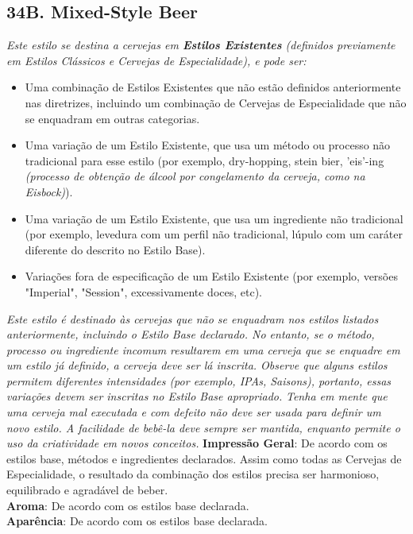 \subsection*{34B. Mixed-Style Beer}
\textit{Este estilo se destina a cervejas em \textbf{Estilos Existentes} (definidos previamente em Estilos Clássicos e Cervejas de Especialidade), e pode ser:}
\begin{itemize}
  \item Uma combinação de Estilos Existentes que não estão definidos anteriormente nas diretrizes, incluindo um combinação de Cervejas de Especialidade que não se enquadram em outras categorias.
  \item Uma variação de um Estilo Existente, que usa um método ou processo não tradicional para esse estilo (por exemplo, dry-hopping, stein bier, 'eis'-ing \textit{(processo de obtenção de álcool por congelamento da cerveja, como na Eisbock)}).
  \item Uma variação de um Estilo Existente, que usa um ingrediente não tradicional (por exemplo, levedura com um perfil não tradicional, lúpulo com um caráter diferente do descrito no Estilo Base).
  \item Variações fora de especificação de um Estilo Existente (por exemplo, versões "Imperial", "Session", excessivamente doces, etc).
\end{itemize}
\textit{Este estilo é destinado às cervejas que não se enquadram nos estilos listados anteriormente, incluindo o Estilo Base declarado. No entanto, se o método, processo ou ingrediente incomum resultarem em uma cerveja que se enquadre em um estilo já definido, a cerveja deve ser lá inscrita. Observe que alguns estilos permitem diferentes intensidades (por exemplo, IPAs, Saisons), portanto, essas variações devem ser inscritas no Estilo Base apropriado.}
\textit{Tenha em mente que uma cerveja mal executada e com defeito não deve ser usada para definir um novo estilo. A facilidade de bebê-la deve sempre ser mantida, enquanto permite o uso da criatividade em novos conceitos.}
\textbf{Impressão Geral}: De acordo com os estilos base, métodos e ingredientes declarados. Assim como todas as Cervejas de Especialidade, o resultado da combinação dos estilos precisa ser harmonioso, equilibrado e agradável de beber. \\
\textbf{Aroma}: De acordo com os estilos base declarada. \\
\textbf{Aparência}: De acordo com os estilos base declarada. \\
